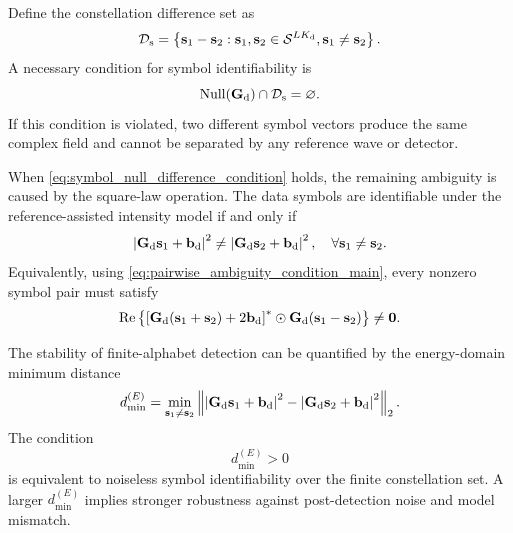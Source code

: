 \documentclass[journal]{IEEEtran}
\begin{document}
Define the constellation difference set as
\begin{equation}
\mathcal{D}_{\rm s}
=
\left\{
\mathbf{s}_1-\mathbf{s}_2:
\mathbf{s}_1,\mathbf{s}_2\in\mathcal{S}^{LK_{\rm d}},
\mathbf{s}_1\neq\mathbf{s}_2
\right\}.
\end{equation}
A necessary condition for symbol identifiability is
\begin{equation}
\operatorname{Null}(\mathbf{G}_{\rm d})
\cap
\mathcal{D}_{\rm s}
=
\varnothing.
\label{eq:symbol_null_difference_condition}
\end{equation}
If this condition is violated, two different symbol vectors produce the same complex field and cannot be separated by any reference wave or detector.

When \eqref{eq:symbol_null_difference_condition} holds, the remaining ambiguity is caused by the square-law operation. 
The data symbols are identifiable under the reference-assisted intensity model if and only if
\begin{equation}
\left|
\mathbf{G}_{\rm d}\mathbf{s}_1+\mathbf{b}_{\rm d}
\right|^2
\neq
\left|
\mathbf{G}_{\rm d}\mathbf{s}_2+\mathbf{b}_{\rm d}
\right|^2,
\quad
\forall \mathbf{s}_1\neq\mathbf{s}_2.
\label{eq:symbol_identifiability_condition}
\end{equation}
Equivalently, using \eqref{eq:pairwise_ambiguity_condition_main}, every nonzero symbol pair must satisfy
\begin{equation}
\operatorname{Re}
\left\{
\left[
\mathbf{G}_{\rm d}(\mathbf{s}_1+\mathbf{s}_2)
+
2\mathbf{b}_{\rm d}
\right]^*
\odot
\mathbf{G}_{\rm d}(\mathbf{s}_1-\mathbf{s}_2)
\right\}
\neq
\mathbf{0}.
\label{eq:symbol_pairwise_condition}
\end{equation}

The stability of finite-alphabet detection can be quantified by the energy-domain minimum distance
\begin{equation}
d_{\min}^{(E)}
=
\min_{\mathbf{s}_1\neq\mathbf{s}_2}
\left\|
\left|
\mathbf{G}_{\rm d}\mathbf{s}_1+\mathbf{b}_{\rm d}
\right|^2
-
\left|
\mathbf{G}_{\rm d}\mathbf{s}_2+\mathbf{b}_{\rm d}
\right|^2
\right\|_2.
\label{eq:energy_domain_min_distance}
\end{equation}
The condition
\begin{equation}
d_{\min}^{(E)}>0
\end{equation}
is equivalent to noiseless symbol identifiability over the finite constellation set. 
A larger $d_{\min}^{(E)}$ implies stronger robustness against post-detection noise and model mismatch.
\end{document}
